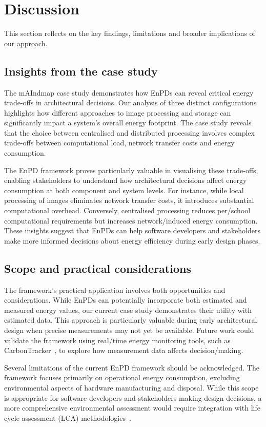 \documentclass[11pt,a4paper]{article}
\begin{document}
\section{Discussion}
This section reflects on the key findings, limitations and broader implications of our approach.

\subsection{Insights from the case study}
The mAIndmap case study demonstrates how EnPDs can reveal critical energy trade-offs in architectural decisions.
Our analysis of three distinct configurations highlights how different approaches to image processing and storage can significantly impact a system's overall energy footprint.
The case study reveals that the choice between centralised and distributed processing involves complex trade-offs between computational load, network transfer costs and energy consumption.

The EnPD framework proves particularly valuable in visualising these trade-offs, enabling stakeholders to understand how architectural decisions affect energy consumption at both component and system levels.
For instance, while local processing of images eliminates network transfer costs, it introduces substantial computational overhead.
Conversely, centralised processing reduces per\-/school computational requirements but increases network\-/induced energy consumption.
These insights suggest that EnPDs can help software developers and stakeholders make more informed decisions about energy efficiency during early design phases.

\subsection{Scope and practical considerations}
The framework's practical application involves both opportunities and considerations.
While EnPDs can potentially incorporate both estimated and measured energy values, our current case study demonstrates their utility with estimated data.
This approach is particularly valuable during early architectural design when precise measurements may not yet be available.
Future work could validate the framework using real\-/time energy monitoring tools, such as CarbonTracker~\cite{anthony2020carbontracker}, to explore how measurement data affects decision\-/making.

Several limitations of the current EnPD framework should be acknowledged.
The framework focuses primarily on operational energy consumption, excluding environmental aspects of hardware manufacturing and disposal.
While this scope is appropriate for software developers and stakeholders making design decisions, a more comprehensive environmental assessment would require integration with life cycle assessment (LCA) methodologies~\cite{guinee2018digesting}.
\end{document}

